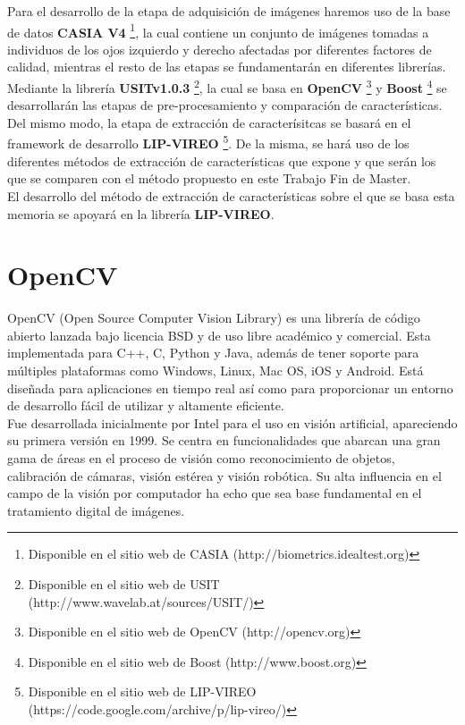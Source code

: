 Para el desarrollo de la etapa de adquisición de imágenes haremos uso de la base de datos \textbf{CASIA V4} \footnote{Disponible en el sitio web de CASIA (http://biometrics.idealtest.org)}, la cual contiene un conjunto de imágenes tomadas a individuos de los ojos izquierdo y derecho afectadas por diferentes factores de calidad, mientras el resto de las etapas se fundamentarán en diferentes librerías. Mediante la librería \textbf{USITv1.0.3} \footnote{Disponible en el sitio web de USIT (http://www.wavelab.at/sources/USIT/)}, la cual se basa en \textbf{OpenCV} \footnote{Disponible en el sitio web de OpenCV (http://opencv.org)} y \textbf{Boost} \footnote{Disponible en el sitio web de Boost (http://www.boost.org)} se desarrollarán las etapas de pre-procesamiento y comparación de características. Del mismo modo, la etapa de extracción de caracterísitcas se basará en el framework de desarrollo \textbf{LIP-VIREO} \footnote{Disponible en el sitio web de LIP-VIREO (https://code.google.com/archive/p/lip-vireo/)}. De la misma, se hará uso de los diferentes métodos de extracción de características que expone y que serán los que se comparen con el método propuesto en este Trabajo Fin de Master. \\

El desarrollo del método de extracción de características sobre el que se basa esta memoria se apoyará en la librería \textbf{LIP-VIREO}. \\




\section{OpenCV}

OpenCV (Open Source Computer Vision Library) es una librería de código abierto lanzada bajo licencia BSD y de uso libre académico y comercial. Esta implementada para C++, C, Python y Java, además de tener soporte para múltiples plataformas como Windows, Linux, Mac OS, iOS y Android. Está diseñada para aplicaciones en tiempo real así como para proporcionar un entorno de desarrollo fácil de utilizar y altamente eficiente. \\

Fue desarrollada inicialmente por Intel para el uso en visión artificial, apareciendo su primera versión en 1999. Se centra en funcionalidades que abarcan una gran gama de áreas en el proceso de visión como reconocimiento de objetos, calibración de cámaras, visión estérea y visión robótica. Su alta influencia en el campo de la visión por computador ha echo que sea base fundamental en el tratamiento digital de imágenes. \\

